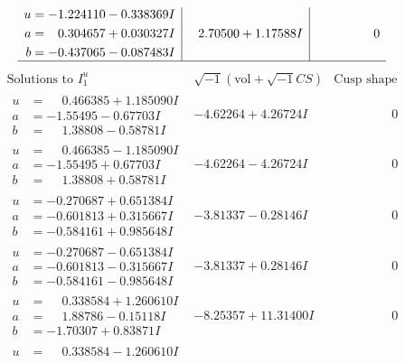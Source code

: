 \documentclass[1p]{elsarticle_modified}
\theoremstyle{definition}
\newcommand{\I}{\sqrt{-1}}
\begin{document}
$$\begin{array}{c|c|c}
\begin{aligned}
u &= -1.224110 - 0.338369 I \\
a &= \phantom{-}0.304657 + 0.030327 I \\
b &= -0.437065 - 0.087483 I\end{aligned}
 & \phantom{-}2.70500 + 1.17588 I & \phantom{-0.000000 } 0\\
 \hline 
 \end{array}$$\newpage$$\begin{array}{c|c|c}  
\text{Solutions to }I^u_{1}& \I (\text{vol} + \sqrt{-1}CS) & \text{Cusp shape}\\
 \hline 
\begin{aligned}
u &= \phantom{-}0.466385 + 1.185090 I \\
a &= -1.55495 - 0.67703 I \\
b &= \phantom{-}1.38808 - 0.58781 I\end{aligned}
 & -4.62264 + 4.26724 I & \phantom{-0.000000 } 0 \\ \hline\begin{aligned}
u &= \phantom{-}0.466385 - 1.185090 I \\
a &= -1.55495 + 0.67703 I \\
b &= \phantom{-}1.38808 + 0.58781 I\end{aligned}
 & -4.62264 - 4.26724 I & \phantom{-0.000000 } 0 \\ \hline\begin{aligned}
u &= -0.270687 + 0.651384 I \\
a &= -0.601813 + 0.315667 I \\
b &= -0.584161 + 0.985648 I\end{aligned}
 & -3.81337 - 0.28146 I & \phantom{-0.000000 } 0 \\ \hline\begin{aligned}
u &= -0.270687 - 0.651384 I \\
a &= -0.601813 - 0.315667 I \\
b &= -0.584161 - 0.985648 I\end{aligned}
 & -3.81337 + 0.28146 I & \phantom{-0.000000 } 0 \\ \hline\begin{aligned}
u &= \phantom{-}0.338584 + 1.260610 I \\
a &= \phantom{-}1.88786 - 0.15118 I \\
b &= -1.70307 + 0.83871 I\end{aligned}
 & -8.25357 + 11.31400 I & \phantom{-0.000000 } 0 \\ \hline\begin{aligned}
u &= \phantom{-}0.338584 - 1.260610 I \\

\end{aligned}
\end{array}$$
\end{document}
